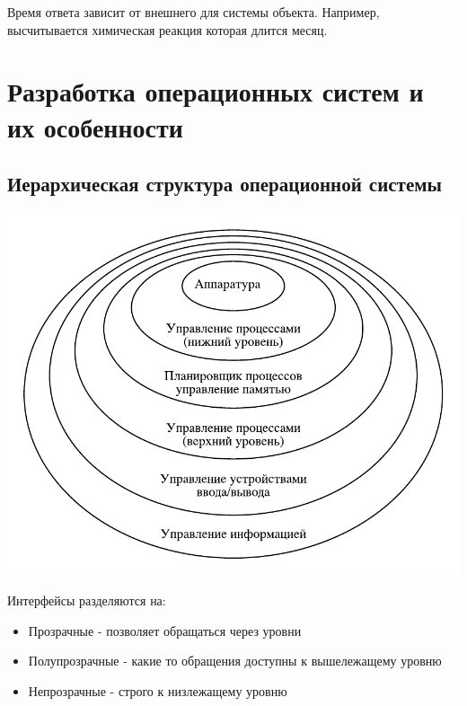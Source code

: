 \documentclass[a4paper, 14pt]{report}
\begin{document}
Время ответа зависит от внешнего для системы объекта. Например, высчитывается химическая реакция которая длится месяц.

\chapter{Разработка операционных систем и их особенности}

\section{Иерархическая структура операционной системы}

\begin{center}
    \includegraphics{os1}
\end{center}

Интерфейсы разделяются на:

\begin{itemize}
    \item Прозрачные - позволяет обращаться через уровни
    \item Полупрозрачные - какие то обращения доступны к вышележащему уровню
    \item Непрозрачные - строго к низлежащему уровню
\end{itemize}

\hfill

\hfill
\end{document}
